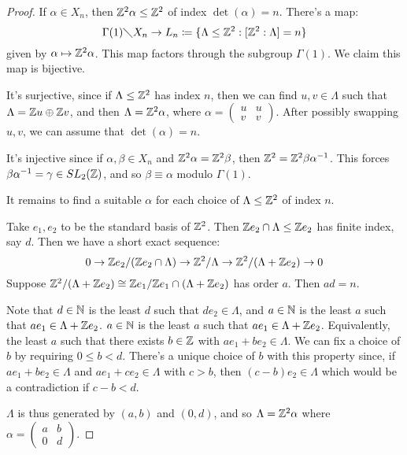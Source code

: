 \documentclass[10pt,a4paper]{article}
\begin{document}
\begin{proof}
  If $\alpha \in X_n$, then $\mathbb{Z}^2 \alpha \leq \mathbb{Z}^2$ of index $\det(\alpha) = n$. There's a map:
  \[\Gamma(1)\diagdown X_n \to L_n \coloneqq \{\Lambda \leq \mathbb{Z}^2 : [\mathbb{Z}^2:\Lambda] = n\}\]
  given by $\alpha \mapsto \mathbb{Z}^2\alpha$. This map factors through the subgroup $\Gamma(1)$. We claim this map is bijective.

  It's surjective, since if $\Lambda \leq \mathbb{Z}^2$ has index $n$, then we can find $u,v \in \Lambda$ such that $\Lambda = \mathbb{Z} u \oplus \mathbb{Z} v$, and then $\Lambda = \mathbb{Z}^2 \alpha$, where $\alpha = \begin{pmatrix} u& u \\v &v \end{pmatrix}$. After possibly swapping $u, v$, we can assume that $\det(\alpha) = n$.

  It's injective since if $\alpha, \beta \in X_n$ and $\mathbb{Z}^2 \alpha = \mathbb{Z}^2 \beta$, then $\mathbb{Z}^2 = \mathbb{Z}^2 \beta \alpha^{-1}$. This forces $\beta \alpha^{-1} = \gamma \in SL_2(\mathbb{Z})$, and so $\beta \equiv \alpha$ modulo $\Gamma(1)$.

  It remains to find a suitable $\alpha$ for each choice of $\Lambda \leq \mathbb{Z}^2$ of index $n$.

  Take $e_1, e_2$ to be the standard basis of $\mathbb{Z}^2$. Then $\mathbb{Z} e_2 \cap \Lambda \leq \mathbb{Z} e_2$ has finite index, say $d$. Then we have a short exact sequence:
  \[0 \to \mathbb{Z} e_2/(\mathbb{Z} e_2 \cap \Lambda) \to \mathbb{Z}^2/ \Lambda \to \mathbb{Z}^2 / (\Lambda+ \mathbb{Z} e_2) \to 0\]
  Suppose $\mathbb{Z}^2 / (\Lambda + \mathbb{Z} e_2) \cong \mathbb{Z} e_1/\mathbb{Z} e_1\cap(\Lambda + \mathbb{Z} e_2)$ has order $a$. Then $ad = n$.

  Note that $d \in \mathbb{N}$ is the least $d$ such that $d e_2 \in \Lambda$, and $a \in \mathbb{N}$ is the least $a$ such that $a e_1 \in \Lambda + \mathbb{Z} e_2$. $a \in \mathbb{N}$ is the least $a$ such that $a e_1 \in \Lambda + \mathbb{Z} e_2$. Equivalently, the least $a$ such that there exists $b \in \mathbb{Z}$ with $a e_1 + b e_2 \in \Lambda$. We can fix a choice of $b$ by requiring $0 \leq b < d$. There's a unique choice of $b$ with this property since, if $a e_1+  b e_2 \in \Lambda$ and $a e_1 + c e_2 \in \Lambda$ with $c > b$, then $(c-b)e_2 \in \Lambda$ which would be a contradiction if $c-b <d$.

  $\Lambda$ is thus generated by $(a, b)$ and $(0, d)$, and so $\Lambda = \mathbb{Z}^2 \alpha$ where $\alpha = \begin{pmatrix} a & b \\ 0 & d\end{pmatrix}$.
\end{proof}
\end{document}
